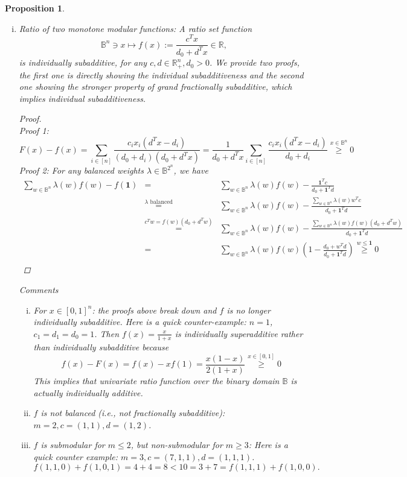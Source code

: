 \documentclass[11pt]{article}\usepackage[]{graphicx}\usepackage[]{xcolor}
\newtheorem{prop}{Proposition}
\begin{document}
\begin{prop}
\begin{enumerate}[(i)]
\item Ratio of two monotone modular functions: A ratio set function 
\[
\mathbb{B}^n\ni x\mapsto f(x):=\frac{c^Tx}{d_0+d^Tx}\in\mathbb{R}, 
\]
is individually subadditive, for any $c, d\in\mathbb{R}^n_{+}, d_0>0$. 
We provide two proofs, the first one is directly showing the individual subadditiveness and the second one  showing the stronger property of grand fractionally subadditive, which implies individual subadditiveness. 
\begin{proof} \quad\\ 
Proof 1: 
\[
F(x)-f(x)=\sum_{i\in [n]}\frac{c_ix_i(d^Tx-d_i)}{(d_0+d_i)(d_0+d^Tx)}=\frac{1}{d_0+d^Tx}\sum_{i\in [n]}\frac{c_ix_i(d^Tx-d_i)}{d_0+d_i}\overset{x\in\mathbb{B}^n}{\ge} 0
\]
Proof 2: For any balanced weights $\lambda\in\mathbb{B}^{2^n}$, we have
\begin{eqnarray*}
\sum_{w\in\mathbb{B}^n}\lambda(w)f(w)-f(\mathbf{1})&=&\sum_{w\in\mathbb{B}^n}\lambda(w)f(w)-\frac{\mathbf{1}^Tc}{d_0+\mathbf{1}^Td}\\
&\overset{\lambda \text{ balanced}}{=}&\sum_{w\in\mathbb{B}^n}\lambda(w)f(w)-\frac{\sum_{w\in\mathbb{B}^n}\lambda(w)w^Tc}{d_0+\mathbf{1}^Td}\\
&\overset{c^Tw=f(w)(d_0+d^Tw)}{=}&\sum_{w\in\mathbb{B}^n}\lambda(w)f(w)-\frac{\sum_{w\in\mathbb{B}^n}\lambda(w)f(w)(d_0+d^Tw)}{d_0+\mathbf{1}^Td}\\
&=&\sum_{w\in\mathbb{B}^n}\lambda(w)f(w)\left(1-\frac{d_0+w^Td}{d_0+\mathbf{1}^Td}\right)\overset{w\le \mathbf{1}}{\ge} 0\\
\end{eqnarray*}
\end{proof}

Comments
\begin{enumerate}[(i)]

\item For $x\in [0,1]^n$: the proofs above break down and $f$ is no longer individually subadditive. Here is a quick counter-example: $n=1$, $c_1=d_1=d_0=1$. Then $f(x)=\frac{x}{1+x}$ is individually superadditive rather than individually subadditive because
\[
f(x)-F(x)=f(x)-xf(1)=\frac{x(1-x)}{2(1+x)}\overset{x\in [0,1]}{\ge} 0
\]
This implies that univariate ratio function over the binary domain $\mathbb{B}$ is actually individually additive. 

\item $f$ is not balanced (i.e., not fractionally subadditive): $m=2, c=(1,1), d=(1,2)$.
\item $f$ is submodular for $m\le 2$, but non-submodular for $m\ge 3$: Here is a quick counter example: $m=3, c=(7,1,1), d=(1,1,1)$. 
\[
f(1,1,0)+f(1,0,1)=4+4=8<10=3+7=f(1,1,1)+f(1,0,0).
\]


\end{enumerate}
\end{enumerate}
\end{prop}
\end{document}
